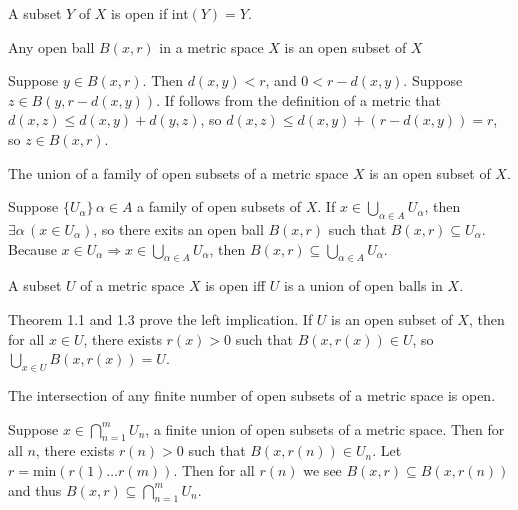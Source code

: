 \documentclass[nobib,notoc]{tufte-handout}
\begin{document}
\begin{defi}
	A subset \(Y\) of \(X\) is open if int\((Y)=Y\).
\end{defi}
\begin{thm}
	Any open ball \(B(x,r)\) in a metric space \(X\) is an open subset of \(X\)
	\begin{IEEEproof}
		Suppose \(y\in B(x,r)\). Then \(d(x,y)<r\), and \(0<r-d(x,y)\). Suppose \(z\in B(y,r-d(x,y))\). If follows from the definition of a metric that \(d(x,z)\leq d(x,y) + d(y,z)\), so \(d(x,z)\leq d(x,y) + (r-d(x,y))=r\), so \(z\in B(x,r)\).
	\end{IEEEproof}
\end{thm}
\begin{thm}
	The union of a family of open subsets of a metric space \(X\) is an open subset of \(X\).
	\begin{IEEEproof}
		Suppose \(\{U_\alpha\}\,\alpha\in A\) a family of open subsets of \(X\). If \(x\in\bigcup_{\alpha\in A}U_\alpha\), then \(\exists\alpha\,(x\in U_\alpha)\), so there exits an open ball \(B(x,r)\) such that \(B(x,r)\subseteq U_\alpha\). Because \(x\in U_\alpha\Rightarrow x\in\bigcup_{\alpha\in A}{U_\alpha}\), then \(B(x,r)\subseteq\bigcup_{\alpha\in A}U_\alpha\).
	\end{IEEEproof}
\end{thm}
\begin{thm}
	A subset \(U\) of a metric space \(X\) is open iff \(U\) is a union of open balls in \(X\).
	\begin{IEEEproof}
		Theorem 1.1 and 1.3 prove the left implication. If \(U\) is an open subset of \(X\), then for all \(x\in U\), there exists \(r(x)>0\) such that \(B(x,r(x))\in U\), so \(\bigcup_{x\in U}B(x,r(x))=U\).
	\end{IEEEproof}
\end{thm}
\begin{thm}
	The intersection of any finite number of open subsets of a metric space is open.
	\begin{IEEEproof}
		Suppose \(x\in\bigcap_{n=1}^{m}U_n\), a finite union of open subsets of a metric space. Then for all \(n\), there exists \(r(n)>0\) such that \(B(x,r(n))\in U_n\). Let \(r=\text{min}(r(1)\ldots r(m))\). Then for all \(r(n)\) we see \(B(x,r)\subseteq B(x,r(n))\) and thus \(B(x,r)\subseteq\bigcap_{n=1}^{m}U_n\).
	\end{IEEEproof}
\end{thm}
\end{document}
